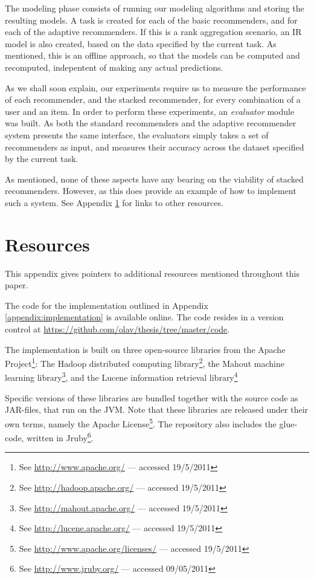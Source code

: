 The modeling phase consists of running our modeling algorithms and storing the resulting models.
A task is created for each of the basic recommenders, and for each of the adaptive recommenders.
If this is a rank aggregation scenario, an IR model is also created, based on the data
specified by the current task.
As mentioned, this is an offline approach, so that the models can be computed and recomputed,
indepentent of making any actual predictions.

As we shall soon explain, our experiments require us to measure the performance of each
recommender, and the stacked recommender, for every combination of 
a user and an item.
In order to perform these experiments, an \emph{evaluator} module was built.
As both the standard recommenders and the adaptive recommender system presents the same 
interface, the evaluators simply takes a set of recommenders as input, 
and measures their accuracy across the dataset specified by the current task.

As mentioned, none of these aspects have any bearing on the viability of stacked recommenders.
However, as this does provide an example of how to implement such a system. 
See Appendix \ref{appendix:resources} for links to other resources. 



\chapter{Resources}
\label{appendix:resources}

This appendix gives pointers to additional resources mentioned throughout this paper.

The code for the implementation outlined in Appendix \ref{appendix:implementation} is available online.
The code resides in a version control at 
\url{https://github.com/olav/thesis/tree/master/code}.

The implementation is built on three open-source libraries from the
Apache Project\footnote{See \url{http://www.apache.org/} --- accessed 19/5/2011}:
The Hadoop distributed computing library\footnote{See \url{http://hadoop.apache.org/} --- accessed 19/5/2011},
the Mahout machine learning library\footnote{See \url{http://mahout.apache.org/} --- accessed 19/5/2011},
and the Lucene information retrieval library\footnote{See \url{http://lucene.apache.org/} --- accessed 19/5/2011}

Specific versions of these libraries are bundled together with
the source code as JAR-files, that run on the JVM.
Note that these libraries are released under their own terms,
namely the Apache License\footnote{
See \url{http://www.apache.org/licenses/} --- accessed 19/5/2011}.
The repository also includes the glue-code, written in Jruby\footnote{
See \url{http://www.jruby.org/} --- accessed 09/05/2011}.


